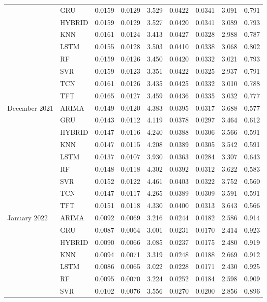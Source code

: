 \begin{tabular}{lllllllll}
 & GRU & 0.0159 & 0.0129 & 3.529 & 0.0422 & 0.0341 & 3.091 & 0.791 \\
 & HYBRID & 0.0159 & 0.0129 & 3.527 & 0.0420 & 0.0341 & 3.089 & 0.793 \\
 & KNN & 0.0161 & 0.0124 & 3.413 & 0.0427 & 0.0328 & 2.988 & 0.787 \\
 & LSTM & 0.0155 & 0.0128 & 3.503 & 0.0410 & 0.0338 & 3.068 & 0.802 \\
 & RF & 0.0159 & 0.0126 & 3.450 & 0.0420 & 0.0332 & 3.021 & 0.793 \\
 & SVR & 0.0159 & 0.0123 & 3.351 & 0.0422 & 0.0325 & 2.937 & 0.791 \\
 & TCN & 0.0161 & 0.0126 & 3.435 & 0.0425 & 0.0332 & 3.010 & 0.788 \\
 & TFT & 0.0165 & 0.0127 & 3.459 & 0.0436 & 0.0335 & 3.032 & 0.777 \\
December 2021 & ARIMA & 0.0149 & 0.0120 & 4.383 & 0.0395 & 0.0317 & 3.688 & 0.577 \\
 & GRU & 0.0143 & 0.0112 & 4.119 & 0.0378 & 0.0297 & 3.464 & 0.612 \\
 & HYBRID & 0.0147 & 0.0116 & 4.240 & 0.0388 & 0.0306 & 3.566 & 0.591 \\
 & KNN & 0.0147 & 0.0115 & 4.208 & 0.0389 & 0.0305 & 3.542 & 0.591 \\
 & LSTM & 0.0137 & 0.0107 & 3.930 & 0.0363 & 0.0284 & 3.307 & 0.643 \\
 & RF & 0.0148 & 0.0118 & 4.302 & 0.0392 & 0.0312 & 3.622 & 0.583 \\
 & SVR & 0.0152 & 0.0122 & 4.461 & 0.0403 & 0.0322 & 3.752 & 0.560 \\
 & TCN & 0.0147 & 0.0117 & 4.265 & 0.0389 & 0.0309 & 3.591 & 0.591 \\
 & TFT & 0.0151 & 0.0118 & 4.330 & 0.0400 & 0.0313 & 3.643 & 0.566 \\
January 2022 & ARIMA & 0.0092 & 0.0069 & 3.216 & 0.0244 & 0.0182 & 2.586 & 0.914 \\
 & GRU & 0.0087 & 0.0064 & 3.001 & 0.0231 & 0.0170 & 2.414 & 0.923 \\
 & HYBRID & 0.0090 & 0.0066 & 3.085 & 0.0237 & 0.0175 & 2.480 & 0.919 \\
 & KNN & 0.0094 & 0.0071 & 3.319 & 0.0248 & 0.0188 & 2.669 & 0.912 \\
 & LSTM & 0.0086 & 0.0065 & 3.022 & 0.0228 & 0.0171 & 2.430 & 0.925 \\
 & RF & 0.0095 & 0.0070 & 3.224 & 0.0252 & 0.0184 & 2.598 & 0.909 \\
 & SVR & 0.0102 & 0.0076 & 3.556 & 0.0270 & 0.0200 & 2.856 & 0.896 \\

\end{tabular}
